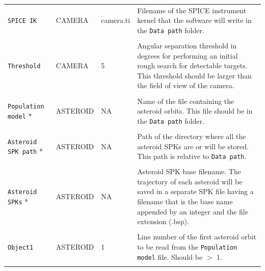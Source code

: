 \documentclass[10pt,a4paper]{article}
\begin{document}
\begin{longtable}{l l p{20mm} p{50mm}}
    \verb+SPICE IK+           & CAMERA        & camera.ti     & Filename of the SPICE instrument kernel that 
                                                               the software will write in the \verb+Data path+ folder. \\ \\
 
    \verb+Threshold+          & CAMERA        & 5             & Angular separation threshold in degrees for 
                                                               performing an initial rough search for 
                                                               detectable targets. This threshold should be larger
                                                               than the field of view of the camera. \\ \\ 
                                                   
    \verb+Population model+ * & ASTEROID      & NA            & Name of the file containing the asteroid orbits.
                                                               This file should be in the \verb+Data path+ folder. \\ \\

    \verb+Asteroid SPK path+ *& ASTEROID      & NA            & Path of the directory where all the asteroid SPKs are or will be stored. 
                                                               This path is relative to \verb+Data path+.\\ \\

    \verb+Asteroid SPKs+ *    & ASTEROID      & NA            & Asteroid SPK base filename. The trajectory of each
                                                               asteroid will be saved in a separate SPK file having a filename
                                                               that is the base name appended by an integer and the file extension (.bsp).\\ \\
                                                   
    \verb+Object1+            & ASTEROID      & 1             & Line number of the first asteroid orbit to be read from the 
                                                               \verb+Population model+ file. Should be $>$ 1. \\ \\
 

\end{longtable}
\end{document}
